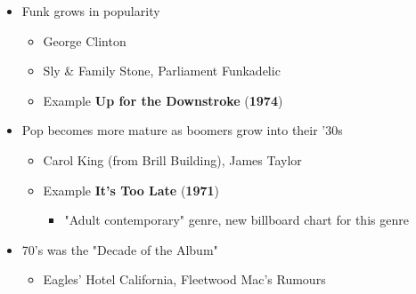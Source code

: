 \documentclass[11pt]{report}
\newcommand{\imp}[1]{\textbf{#1}}
\newcommand{\idate}[2]{\textcolor{blue!50}{\imp{#1}}\label{date:#2}}
\newcommand{\bl}{\begin{itemize}}
\newcommand{\kl}{\end{itemize}}
\newcommand{\song}[2]{\textcolor{red!70}{\textbf{#1}} (\idate{#2}{#1})}
\begin{document}
\begin{itemize}
	\item Funk grows in popularity
	\bl
		\item George Clinton
		\item Sly \& Family Stone, Parliament Funkadelic
		\item Example \song{Up for the Downstroke}{1974}
	\kl
	\item Pop becomes more mature as boomers grow into their '30s
	\bl
		\item Carol King (from Brill Building), James Taylor
		\item Example \song{It's Too Late}{1971}
		\bl
			\item "Adult contemporary" genre, new billboard chart for this genre
		\kl
	\kl
	\item 70's was the "Decade of the Album"
	\bl
		\item Eagles' Hotel California, Fleetwood Mac's Rumours
	\kl

\end{itemize}
\end{document}
